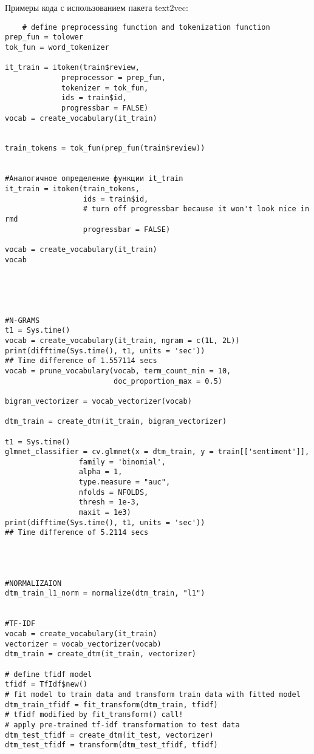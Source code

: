 \documentclass[bachelor, och, coursework ]{SCWorks}
\begin{document}
Примеры кода с использованием пакета text2vec:
\begin{verbatim}
    # define preprocessing function and tokenization function
prep_fun = tolower
tok_fun = word_tokenizer

it_train = itoken(train$review, 
             preprocessor = prep_fun, 
             tokenizer = tok_fun, 
             ids = train$id, 
             progressbar = FALSE)
vocab = create_vocabulary(it_train)


train_tokens = tok_fun(prep_fun(train$review))


#Аналогичное определение функции it_train
it_train = itoken(train_tokens, 
                  ids = train$id,
                  # turn off progressbar because it won't look nice in rmd
                  progressbar = FALSE)

vocab = create_vocabulary(it_train)
vocab





#N-GRAMS
t1 = Sys.time()
vocab = create_vocabulary(it_train, ngram = c(1L, 2L))
print(difftime(Sys.time(), t1, units = 'sec'))
## Time difference of 1.557114 secs
vocab = prune_vocabulary(vocab, term_count_min = 10, 
                         doc_proportion_max = 0.5)

bigram_vectorizer = vocab_vectorizer(vocab)

dtm_train = create_dtm(it_train, bigram_vectorizer)

t1 = Sys.time()
glmnet_classifier = cv.glmnet(x = dtm_train, y = train[['sentiment']], 
                 family = 'binomial', 
                 alpha = 1,
                 type.measure = "auc",
                 nfolds = NFOLDS,
                 thresh = 1e-3,
                 maxit = 1e3)
print(difftime(Sys.time(), t1, units = 'sec'))
## Time difference of 5.2114 secs




#NORMALIZAION
dtm_train_l1_norm = normalize(dtm_train, "l1")


#TF-IDF
vocab = create_vocabulary(it_train)
vectorizer = vocab_vectorizer(vocab)
dtm_train = create_dtm(it_train, vectorizer)

# define tfidf model
tfidf = TfIdf$new()
# fit model to train data and transform train data with fitted model
dtm_train_tfidf = fit_transform(dtm_train, tfidf)
# tfidf modified by fit_transform() call!
# apply pre-trained tf-idf transformation to test data
dtm_test_tfidf = create_dtm(it_test, vectorizer)
dtm_test_tfidf = transform(dtm_test_tfidf, tfidf)
\end{verbatim}
\end{document}
